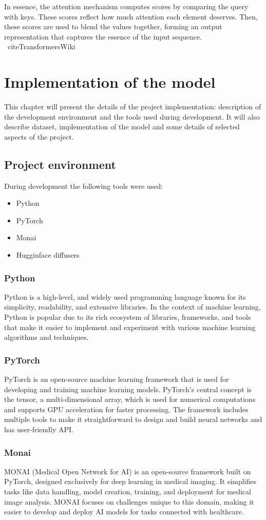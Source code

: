\documentclass[11pt,a4paper]{report}
\begin{document}
In essence, the attention mechanism computes scores by comparing the query with keys. These scores reflect how much attention each element deserves. Then, these scores are used to blend the values together, forming an output representation that captures the essence of the input sequence. \cite{AttentionIsAll} \cite{AttentionWiki}\ cite{TransformersWiki}

\chapter{Implementation of the model}
This chapter will present the details of the project implementation: description of the development environment and the tools used during development. It will also describe dataset, implementation of the model and some details of selected aspects of the project.
\section{Project environment}
During development the following tools were used:
\begin{itemize}
\item Python 
\item PyTorch
\item Monai
\item Hugginface diffusers 
\end{itemize}
\subsection{Python}
Python is a high-level, and widely used programming language known for its simplicity, readability, and extensive libraries. In the context of machine learning, Python is popular due to its rich ecosystem of libraries, frameworks, and tools that make it easier to implement and experiment with various machine learning algorithms and techniques. \cite{Python}
\subsection{PyTorch}
PyTorch is an open-source machine learning framework that is used for developing and training machine learning models. PyTorch's central concept is the tensor, a multi-dimensional array, which is used for numerical computations and supports GPU acceleration for faster processing. The framework includes multiple tools to make it straightforward to design and build neural networks and has user-friendly API. \cite{Pytorch}
\subsection{Monai}
MONAI (Medical Open Network for AI) is an open-source framework built on PyTorch, designed exclusively for deep learning in medical imaging. It simplifies tasks like data handling, model creation, training, and deployment for medical image analysis. MONAI focuses on challenges unique to this domain, making it easier to develop and deploy AI models for tasks connected with healthcare. \cite{Monai}
\end{document}
